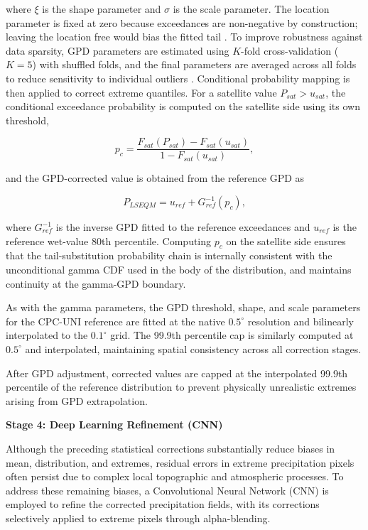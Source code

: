 \documentclass[remotesensing,article,submit,pdftex,moreauthors]{Definitions/mdpi}
\begin{document}
where \(\xi\) is the shape parameter and \(\sigma\) is the scale
parameter. The location parameter is fixed at zero because exceedances
are non-negative by construction; leaving the location free would bias
the fitted tail \cite{ref7}. To improve robustness against data sparsity,
GPD parameters are estimated using \(K\)-fold cross-validation
(\(K = 5\)) with shuffled folds, and the final parameters are averaged
across all folds to reduce sensitivity to individual outliers \cite{ref25}.
Conditional probability mapping is then applied to correct extreme
quantiles. For a satellite value \(P_{sat} > u_{sat}\), the conditional
exceedance probability is computed on the satellite side using its own
threshold,

\[p_c = \frac{F_{sat}(P_{sat}) - F_{sat}(u_{sat})}{1 - F_{sat}(u_{sat})},\]

and the GPD-corrected value is obtained from the reference GPD as

\[P_{LSEQM} = u_{ref} + G_{ref}^{-1}(p_c),\]

where \(G_{ref}^{-1}\) is the inverse GPD fitted to the reference
exceedances and \(u_{ref}\) is the reference wet-value 80th percentile.
Computing \(p_c\) on the satellite side ensures that the
tail-substitution probability chain is internally consistent with the
unconditional gamma CDF used in the body of the distribution, and
maintains continuity at the gamma-GPD boundary.

As with the gamma parameters, the GPD threshold, shape, and scale
parameters for the CPC-UNI reference are fitted at the native
\(0.5^{\circ}\) resolution and bilinearly interpolated to the
\(0.1^{\circ}\) grid. The 99.9th percentile cap is similarly computed at
\(0.5^{\circ}\) and interpolated, maintaining spatial consistency across
all correction stages.

After GPD adjustment, corrected values are capped at the interpolated
99.9th percentile of the reference distribution to prevent physically
unrealistic extremes arising from GPD extrapolation.

\textbf{Stage 4: Deep Learning Refinement (CNN)}

Although the preceding statistical corrections substantially reduce
biases in mean, distribution, and extremes, residual errors in extreme
precipitation pixels often persist due to complex local topographic and
atmospheric processes. To address these remaining biases, a
Convolutional Neural Network (CNN) is employed to refine the corrected
precipitation fields, with its corrections selectively applied to
extreme pixels through alpha-blending.
\end{document}
